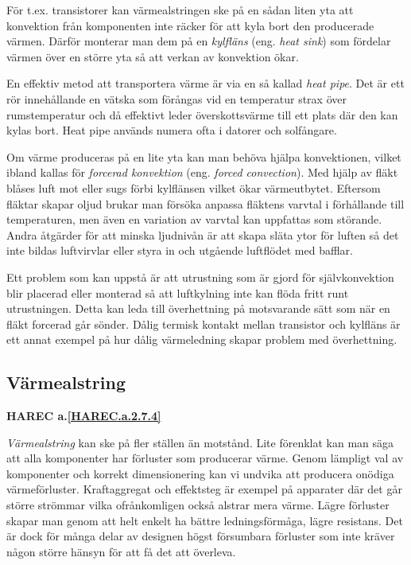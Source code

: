För t.ex. transistorer kan värmealstringen ske på en sådan liten yta att
konvektion från komponenten inte räcker för att kyla bort den producerade
värmen. Därför monterar man dem på en \emph{kylfläns} (eng.
\emph{heat sink}) som fördelar värmen över en större yta så att verkan av
konvektion ökar.

En effektiv metod att transportera värme är via en så kallad \emph{heat pipe}.
Det är ett rör innehållande en vätska som förångas vid en temperatur strax över
rumstemperatur och då effektivt leder överskottsvärme till ett plats där den kan
kylas bort. Heat pipe används numera ofta i datorer och solfångare.

Om värme produceras på en lite yta kan man behöva hjälpa konvektionen, vilket
ibland kallas för \emph{forcerad konvektion} (eng. \emph{forced convection}).
Med hjälp av fläkt blåses luft mot eller sugs förbi kylflänsen vilket ökar
värmeutbytet. Eftersom fläktar skapar oljud brukar man försöka anpassa
fläktens varvtal i förhållande till temperaturen, men även en variation av
varvtal kan uppfattas som störande. Andra åtgärder för att minska ljudnivån
är att skapa släta ytor för luften så det inte bildas luftvirvlar eller
styra in och utgående luftflödet med bafflar.

Ett problem som kan uppstå är att utrustning som är gjord för självkonvektion
blir placerad eller monterad så att luftkylning inte kan flöda fritt runt
utrustningen. Detta kan leda till överhettning på motsvarande sätt som när
en fläkt forcerad går sönder. Dålig  termisk kontakt mellan transistor och
kylfläns är ett annat exempel på hur dålig värmeledning skapar problem med
överhettning.

\subsection{Värmealstring}
\textbf{
HAREC a.\ref{HAREC.a.2.7.4}\label{myHAREC.a.2.7.4}
}

\emph{Värmealstring} kan ske på fler ställen än motstånd. Lite förenklat
kan man säga att alla komponenter har förluster som producerar värme. Genom
lämpligt val av komponenter och korrekt dimensionering kan vi undvika att
producera onödiga värmeförluster. Kraftaggregat och effektsteg är exempel
på apparater där det går större strömmar vilka ofrånkomligen också alstrar
mera värme. Lägre förluster skapar man genom att helt enkelt ha bättre
ledningsförmåga, lägre resistans. Det är dock för många delar av designen
högst försumbara förluster som inte kräver någon större hänsyn för att få
det att överleva.

